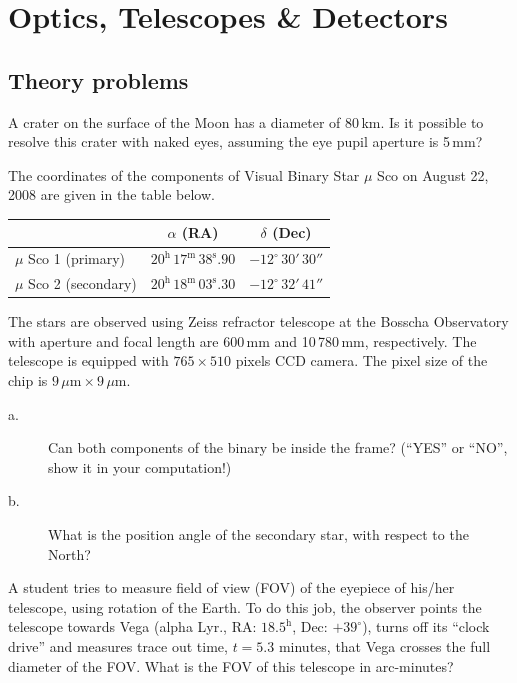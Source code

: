 \chapter{Optics, Telescopes \& Detectors}

\section*{Theory problems}

A crater on the surface of the Moon has a diameter of 80\,km. Is it possible to
resolve this crater with naked eyes, assuming the eye pupil aperture is 5\,mm?

The coordinates of the components of Visual Binary Star $\mu$ Sco on August 22,
2008 are given in the table below.

\begin{center}
\begin{tabular}{|l|c|c|}
\hline
 & $\alpha$ (RA) & $\delta$ (Dec) \\
\hline
$\mu$ Sco 1 (primary) & $20^{\mathrm{h}}\,17^{\mathrm{m}}\,38^{\mathrm{s}}\!.90$
  & $-12^\circ\,30'\,30''$ \\
\hline
$\mu$ Sco 2 (secondary) &
  $20^{\mathrm{h}}\,18^{\mathrm{m}}\,03^{\mathrm{s}}\!.30$
  & $-12^\circ\,32'\,41''$ \\
\hline
\end{tabular}
\end{center}

The stars are observed using Zeiss refractor telescope at the Bosscha
Observatory with aperture and focal length are 600\,mm and 10\,780\,mm,
respectively. The telescope is equipped with $765 \times 510$ pixels CCD
camera. The pixel size of the chip is
$9\,\mu\mathrm{m} \times 9\,\mu\mathrm{m}$.

\begin{description}
\item[a.] Can both components of the binary be inside the frame? (``YES'' or
  ``NO'', show it in your computation!)
\item[b.] What is the position angle of the secondary star, with respect to the
  North?
\end{description}

A student tries to measure field of view (FOV) of the eyepiece of his/her
telescope, using rotation of the Earth. To do this job, the observer points the
telescope towards Vega (alpha Lyr., RA: $18.5^{\mathrm{h}}$, Dec: $+39^\circ$),
turns off its ``clock drive'' and measures trace out time, $t = 5.3$ minutes,
that Vega crosses the full diameter of the FOV. What is the FOV of this
telescope in arc-minutes?

